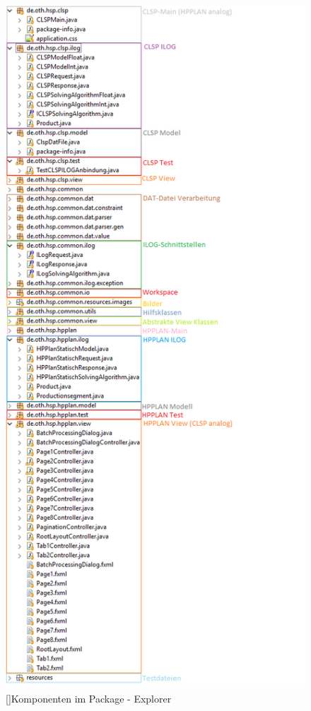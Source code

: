 \documentclass[12pt,a4paper, listof=entryprefix, bibliography=totocnumbered,toc=listofnumbered,lof=listofnumbered]{scrartcl}
\begin{document}
\begin{figure}[H]
	\centering
	\includegraphics[scale=0.68]{images/komponenten.png} 
	[]{Komponenten im Package - Explorer}
	\label{fig:komponenten}
\end{figure}
\end{document}
